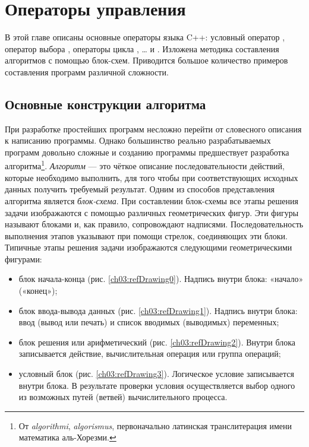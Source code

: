 \chapter[Операторы управления]{Операторы управления}

В этой главе описаны основные операторы языка C++: условный оператор , оператор выбора
, операторы цикла , … и
. Изложена методика составления алгоритмов с помощью блок-схем. Приводится большое количество
примеров составления программ различной сложности. 

\section[Основные конструкции алгоритма]{Основные конструкции алгоритма}
При разработке простейших программ несложно перейти от словесного описания к написанию программы. Однако большинство
реально разрабатываемых программ довольно сложные и созданию программы предшествует разработка алгоритма\footnote{От
\emph{algorithmi}, \emph{algorismus}, первоначально латинская транслитерация имени математика
аль-Хорезми.}. \emph{Алгоритм} --- это чёткое описание последовательности действий, которые
необходимо выполнить, для того чтобы при соответствующих исходных данных получить требуемый результат. Одним из
способов представления алгоритма является \emph{блок-схема}. При составлении блок-схемы
все этапы решения задачи изображаются с помощью различных геометрических фигур. Эти фигуры называют блоками и, как
правило, сопровождают надписями. Последовательность выполнения этапов указывают при помощи стрелок, соединяющих эти
блоки. Типичные этапы решения задачи изображаются следующими геометрическими фигурами:
\begin{itemize}
\item блок начала-конца (рис. \ref{ch03:refDrawing0}). Надпись внутри блока: «начало» («конец»);

\item блок ввода-вывода данных (рис. \ref{ch03:refDrawing1}). Надпись внутри блока: ввод (вывод или печать) и список вводимых
(выводимых) переменных;

\item блок решения или арифметический (рис. \ref{ch03:refDrawing2}). 
Внутри блока записывается действие, вычислительная операция
или группа операций;

\item условный блок (рис. \ref{ch03:refDrawing3}). Логическое условие записывается внутри блока. В результате проверки условия
осуществляется выбор одного из возможных путей (ветвей) вычислительного процесса. 
\end{itemize}

